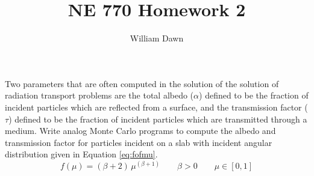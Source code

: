 \documentclass{article}
\newcommand{\albedo}{\alpha}
\newcommand{\transmission}{\tau}
\begin{document}
\title{NE 770 Homework 2}
\author{William Dawn}
\maketitle

Two parameters that are often computed in the solution of the solution of radiation transport problems are the total albedo ($\albedo$) defined to be the fraction of incident particles which are reflected from a surface, and the transmission factor ($\transmission$) defined to be the fraction of incident particles which are transmitted through a medium. Write analog Monte Carlo programs to compute the albedo and transmission factor for particles incident on a slab with incident angular distribution given in Equation \eqref{eq:fofmu}.
\begin{equation}
  \label{eq:fofmu}
  f(\mu) = (\beta + 2) \, \mu^{(\beta+1)} \qquad \beta > 0 \qquad \mu \in [0,1]
\end{equation}
\end{document}
